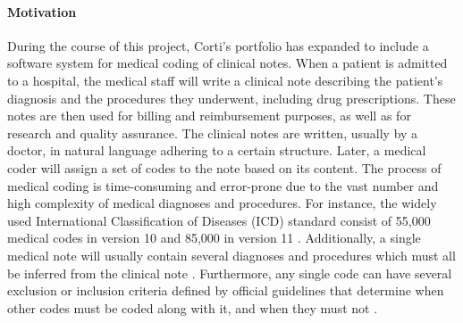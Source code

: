 \paragraph{Motivation} During the course of this project, Corti's portfolio has expanded to include a software system for medical coding of clinical notes. 
When a patient is admitted to a hospital, the medical staff will write a clinical note describing the patient's diagnosis and the procedures they underwent, including drug prescriptions. 
These notes are then used for billing and reimbursement purposes, as well as for research and quality assurance. 
The clinical notes are written, usually by a doctor, in natural language adhering to a certain structure. Later, a medical coder will assign a set of codes to the note based on its content. 
The process of medical coding is time-consuming and error-prone due to the vast number and high complexity of medical diagnoses and procedures. For instance, the widely used International Classification of Diseases (ICD) standard consist of 55,000 medical codes in version 10 and 85,000 in version 11 \cite{worldhealthorganisationwho_international_2023}. Additionally, a single medical note will usually contain several diagnoses and procedures which must all be inferred from the clinical note \cite{johnsonMIMICIIIFreelyAccessible2016,johnsonMIMICIVFreelyAccessible2023}. 
Furthermore, any single code can have several exclusion or inclusion criteria defined by official guidelines that determine when other codes must be coded along with it, and when they must not \cite{centersformedicaremedicaidservicesus_icd10cm_2023}. 

